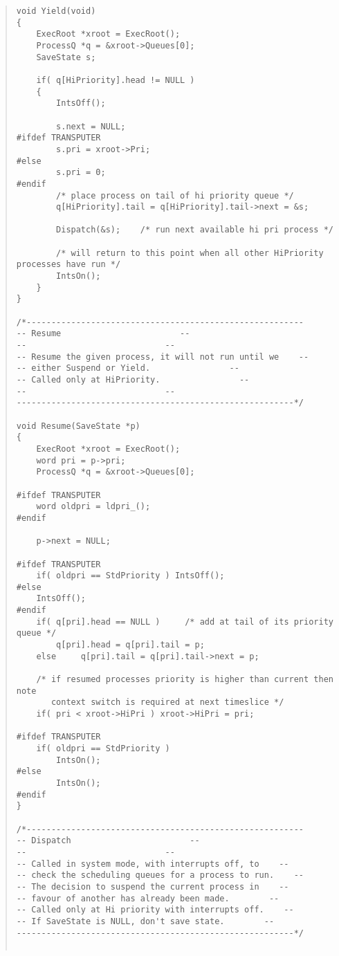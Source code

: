 \begin {quote}
\begin{verbatim}
void Yield(void)
{
    ExecRoot *xroot = ExecRoot();
    ProcessQ *q = &xroot->Queues[0];
    SaveState s;

    if( q[HiPriority].head != NULL )
    {
        IntsOff();

        s.next = NULL;
#ifdef TRANSPUTER
        s.pri = xroot->Pri;
#else
        s.pri = 0;
#endif
        /* place process on tail of hi priority queue */
        q[HiPriority].tail = q[HiPriority].tail->next = &s;

        Dispatch(&s);    /* run next available hi pri process */

        /* will return to this point when all other HiPriority processes have run */
        IntsOn();
    }
}

/*--------------------------------------------------------
-- Resume                        --
--                            --
-- Resume the given process, it will not run until we    --
-- either Suspend or Yield.                --
-- Called only at HiPriority.                --
--                            --
--------------------------------------------------------*/

void Resume(SaveState *p)
{
    ExecRoot *xroot = ExecRoot();
    word pri = p->pri;
    ProcessQ *q = &xroot->Queues[0];

#ifdef TRANSPUTER
    word oldpri = ldpri_();
#endif
    
    p->next = NULL;

#ifdef TRANSPUTER
    if( oldpri == StdPriority ) IntsOff();
#else
    IntsOff();
#endif
    if( q[pri].head == NULL )     /* add at tail of its priority queue */
        q[pri].head = q[pri].tail = p;
    else     q[pri].tail = q[pri].tail->next = p;

    /* if resumed processes priority is higher than current then note
       context switch is required at next timeslice */
    if( pri < xroot->HiPri ) xroot->HiPri = pri;

#ifdef TRANSPUTER
    if( oldpri == StdPriority )
        IntsOn();
#else
        IntsOn();
#endif
}

/*--------------------------------------------------------
-- Dispatch                        --
--                            --
-- Called in system mode, with interrupts off, to    --
-- check the scheduling queues for a process to run.    --
-- The decision to suspend the current process in    --
-- favour of another has already been made.        --
-- Called only at Hi priority with interrupts off.    --
-- If SaveState is NULL, don't save state.        --
--------------------------------------------------------*/


\end{verbatim}
\end{quote}
